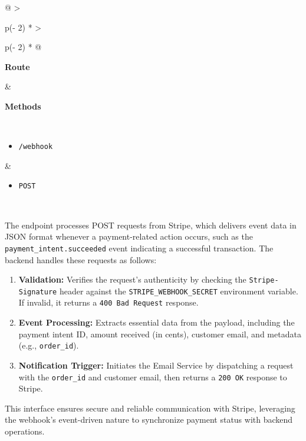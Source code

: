 \begin{longtable}[]{@{}
    >{\raggedright\arraybackslash}p{(\columnwidth - 2\tabcolsep) * }
    >{\raggedright\arraybackslash}p{(\columnwidth - 2\tabcolsep) * }@{}}
    \toprule
    \begin{minipage}[b]{\linewidth}\raggedright
    \textbf{Route}
    \end{minipage} & \begin{minipage}[b]{\linewidth}\raggedright
    \textbf{Methods}
    \end{minipage} \\
    \midrule
    \endhead
    \begin{itemize}
        \item \texttt{/webhook}
    \end{itemize} &
    \begin{itemize}
        \item \texttt{POST}
    \end{itemize} \\
    \bottomrule
\end{longtable}

The endpoint processes POST requests from Stripe, which delivers event data in JSON format whenever a payment-related action occurs, such as the \texttt{payment\_intent.succeeded} event indicating a successful transaction. The backend handles these requests as follows:
\begin{enumerate}
    \item \textbf{Validation:} Verifies the request’s authenticity by checking the \texttt{Stripe-Signature} header against the \texttt{STRIPE\_WEBHOOK\_SECRET} environment variable. If invalid, it returns a \texttt{400 Bad Request} response.
    \item \textbf{Event Processing:} Extracts essential data from the payload, including the payment intent ID, amount received (in cents), customer email, and metadata (e.g., \texttt{order\_id}). 
    \item \textbf{Notification Trigger:} Initiates the Email Service by dispatching a request with the \texttt{order\_id} and customer email, then returns a \texttt{200 OK} response to Stripe.
\end{enumerate}

This interface ensures secure and reliable communication with Stripe, leveraging the webhook’s event-driven nature to synchronize payment status with backend operations.

